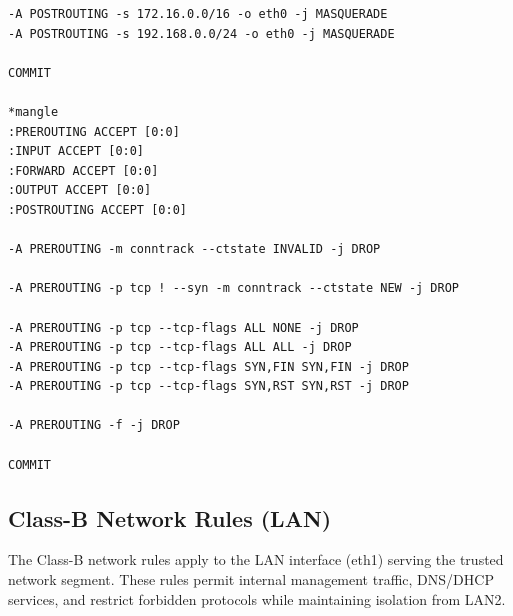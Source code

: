 \begin{verbatim}
-A POSTROUTING -s 172.16.0.0/16 -o eth0 -j MASQUERADE
-A POSTROUTING -s 192.168.0.0/24 -o eth0 -j MASQUERADE

COMMIT

*mangle
:PREROUTING ACCEPT [0:0]
:INPUT ACCEPT [0:0]
:FORWARD ACCEPT [0:0]
:OUTPUT ACCEPT [0:0]
:POSTROUTING ACCEPT [0:0]

-A PREROUTING -m conntrack --ctstate INVALID -j DROP

-A PREROUTING -p tcp ! --syn -m conntrack --ctstate NEW -j DROP

-A PREROUTING -p tcp --tcp-flags ALL NONE -j DROP
-A PREROUTING -p tcp --tcp-flags ALL ALL -j DROP
-A PREROUTING -p tcp --tcp-flags SYN,FIN SYN,FIN -j DROP
-A PREROUTING -p tcp --tcp-flags SYN,RST SYN,RST -j DROP

-A PREROUTING -f -j DROP

COMMIT
\end{verbatim}

\subsection{Class-B Network Rules (LAN)}
\label{subsec:class-b-rules}

The Class-B network rules apply to the LAN interface (eth1) serving the trusted network segment. These rules permit internal management traffic, DNS/DHCP services, and restrict forbidden protocols while maintaining isolation from LAN2.

